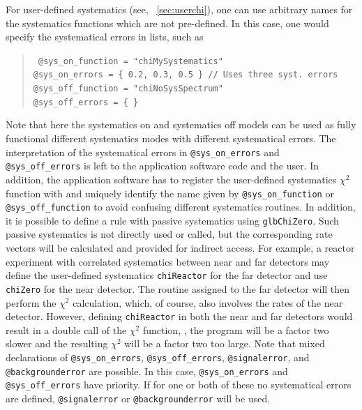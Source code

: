 For user-defined systematics 
(see, \Sec~\ref{sec:userchi}), one can use arbitrary names
for the systematics functions which are not pre-defined. In this case,
one would specify the systematical errors in lists, such as
\begin{quote}
{\tt
\tb @sys\_on\_function = "chiMySystematics"  \\
\tb @sys\_on\_errors = \{ 0.2, 0.3, 0.5 \}~// Uses three syst. errors \\
\tb @sys\_off\_function = "chiNoSysSpectrum"  \\
\tb @sys\_off\_errors = \{ \}
}
\end{quote}
Note that here the systematics on and systematics off models can be used 
as fully functional different systematics modes with different systematical
errors. The interpretation of the systematical errors in {\tt @sys\_on\_errors} and
{\tt @sys\_off\_errors} is left to the application software code and the user.
In addition, the application software has to register the user-defined systematics $\chi^2$
function with  and uniquely identify the name
given by {\tt @sys\_on\_function} or {\tt @sys\_off\_function} to avoid
confusing different systematics routines. In addition, it is possible to define
a rule with passive systematics using {\tt glbChiZero}. Such passive systematics
is not directly used or called, but the corresponding rate vectors will be calculated
and provided for indirect access. For example, a reactor experiment with correlated
systematics between near and far detectors may define the user-defined systematics
{\tt chiReactor} for the far detector and use {\tt chiZero} for the near detector.
The routine assigned to the far detector will then perform the $\chi^2$ calculation,
which, of course, also involves the rates of the near detector. However, defining
{\tt chiReactor} in both the near and far detectors would result in a double call
of the $\chi^2$ function, \ie, the program will be a factor two slower and the
resulting $\chi^2$ will be a factor two too large.
Note that mixed declarations of {\tt @sys\_on\_errors}, {\tt @sys\_off\_errors}, {\tt @signalerror}, and
{\tt @backgrounderror} are possible. In this case, {\tt @sys\_on\_errors} and {\tt @sys\_off\_errors}
have priority. If for one or both of these no systematical errors are defined, {\tt @signalerror} or
{\tt @backgrounderror} will be used.

